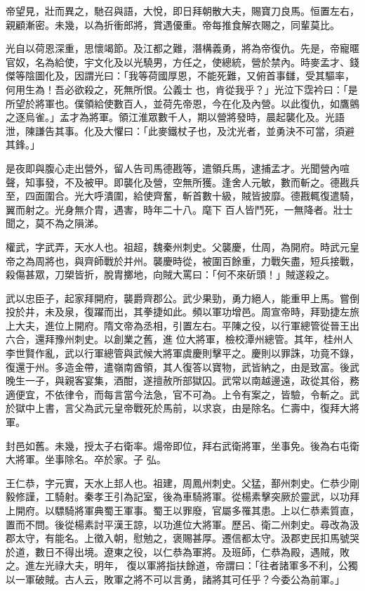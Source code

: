 \begin{pinyinscope}
 帝望見，壯而異之，馳召與語，大悅，即日拜朝散大夫，賜寶刀良馬。恒置左右，親顧漸密。未幾，以為折衝郎將，賞遇優重。帝每推食解衣賜之，同輩莫比。



 光自以荷恩深重，思懷竭節。及江都之難，潛構義勇，將為帝復仇。先是，帝寵暱官奴，名為給使，宇文化及以光驍男，方任之，使總統，營於禁內。時麥孟才、錢傑等陰圖化及，因謂光曰：「我等荷國厚恩，不能死難，又俯首事讎，受其驅率，何用生為！吾必欲殺之，死無所恨。公義士
 也，肯從我乎？」光泣下霑衿曰：「是所望於將軍也。僕領給使數百人，並荷先帝恩，今在化及內營。以此復仇，如鷹鸇之逐烏雀。」孟才為將軍。領江淮眾數千人，期以營將發時，晨起襲化及。光語泄，陳謙告其事。化及大懼曰：「此麥鐵杖子也，及沈光者，並勇決不可當，須避其鋒。」



 是夜即與腹心走出營外，留人告司馬德戡等，遣領兵馬，逮捕孟才。光聞營內喧聲，知事發，不及被甲。即襲化及營，空無所獲。逢舍人元敏，數而斬之。德戡兵至，四面圍合。光大呼潰圍，給使齊奮，斬首數十級，賊皆披靡。德戡輒復遣騎，翼而射之。光身無介胄，遇害，時年二十八。麾下
 百人皆鬥死，一無降者。壯士聞之，莫不為之隕涕。



 權武，字武弄，天水人也。祖超，魏秦州刺史。父襲慶，仕周，為開府。時武元皇帝之為周將也，與齊師戰於并州。襲慶時從，被圍百餘重，力戰矢盡，短兵接戰，殺傷甚眾，刀槊皆折，脫胄擲地，向賊大罵曰：「何不來斫頭！」賊遂殺之。



 武以忠臣子，起家拜開府，襲爵齊郡公。武少果勁，勇力絕人，能重甲上馬。嘗倒投於井，未及泉，復躍而出，其拳捷如此。頻以軍功增邑。周宣帝時，拜勁捷左旅上大夫，進位上開府。隋文帝為丞相，引置左右。平陳之役，以行軍總管從晉王出六合，還拜豫州刺史。以創業之舊，進
 位大將軍，檢校潭州總管。其年，桂州人李世賢作亂，武以行軍總管與武候大將軍虞慶則擊平之。慶則以罪誅，功竟不錄，復還于州。多造金帶，遣嶺南酋領，其人復答以寶物，武皆納之，由是致富。後武晚生一子，與親客宴集，酒酣，遂擅赦所部獄囚。武常以南越邊遠，政從其俗，務適便宜，不依律令，而每言當今法急，官不可為。上令有案之，皆驗，令斬之。武於獄中上書，言父為武元皇帝戰死於馬前，以求哀，由是除名。仁壽中，復拜大將軍。



 封邑如舊。未幾，授太子右衛率。煬帝即位，拜右武衛將軍，坐事免。後為右屯衛大將軍。坐事除名。卒於家。子
 弘。



 王仁恭，字元實，天水上邽人也。祖建，周鳳州刺史。父猛，鄯州刺史。仁恭少剛毅修謹，工騎射。秦孝王引為記室，後為車騎將軍。從楊素擊突厥於靈武，以功拜上開府。以驃騎將軍典蜀王軍事。蜀王以罪廢，官屬多罹其患。上以仁恭素質直，置而不問。後從楊素討平漢王諒，以功進位大將軍。歷呂、衛二州刺史。尋改為汲郡太守，有能名。上徵入朝，慰勉之，褒賜甚厚。遷信都太守。汲郡吏民扣馬號哭於道，數日不得出境。遼東之役，以仁恭為軍將。及班師，仁恭為殿，遇賊，敗之。進左光祿大夫，明年，
 復以軍將指扶餘道，帝謂曰：「往者諸軍多不利，公獨以一軍破賊。古人云，敗軍之將不可以言勇，諸將其可任乎？今委公為前軍。」




\end{pinyinscope}
